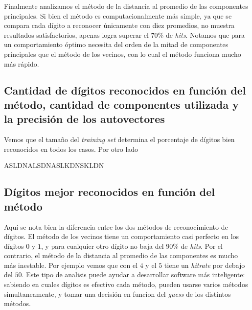 		Finalmente analizamos el m\'etodo de la distancia al promedio de las componentes
		principales. Si bien el m\'etodo es computacionalmente m\'as simple, ya que se
		compara cada d\'igito a reconocer \'unicamente con diez promedios, no muestra
		resultados satisfactorios, apenas logra superar el $70\%$ de \textit{hits}.
		Notamos que para un comportamiento \'optimo necesita del orden de la mitad de
		componentes principales que el m\'etodo de los vecinos, con lo cual el m\'etodo
		funciona mucho m\'as r\'apido.


	\subsection{Cantidad de d\'igitos reconocidos en funci\'on del m\'etodo,
	cantidad de componentes utilizada y la precisi\'on de los autovectores}

		Vemos que el tama\~no del \textit{training set} determina el porcentaje de d\'igitos bien
		reconocidos en todos los casos. Por otro lado 

		ASLDNALSDNASLKDNSKLDN


	\subsection{D\'igitos mejor reconocidos en funci\'on del m\'etodo}

		Aqu\'i se nota bien la diferencia entre los dos m\'etodos de reconocimiento de
		d\'igitos. El m\'etodo de los vecinos tiene un comportamiento casi perfecto en
		los d\'igitos $0$ y $1$, y para cualquier otro d\'igito no baja del $90\%$ de
		\textit{hits}. Por el contrario, el m\'etodo de la distancia al promedio de las
		componentes es mucho m\'as inestable. Por ejemplo vemos que con el $4$ y el $5$
		tiene un \textit{hitrate} por debajo del $50$. Este tipo de analisis puede ayudar
		a desarrollar software m\'as inteligente: sabiendo en cuales d\'igitos es efectivo
		cada m\'etodo, pueden usarse varios m\'etodos simultaneamente, y tomar una decisi\'on
		en funcion del \textit{guess} de los distintos m\'etodos.
